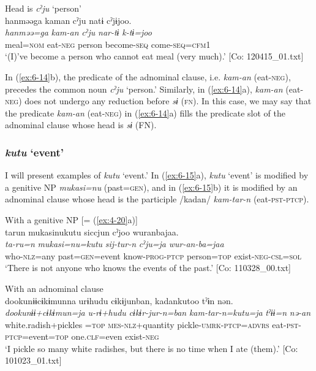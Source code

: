 \ex Head is \textit{cˀju} ‘person’\\
{\TM}
\glll  hanməəga  kaman  cˀju  natɨ  cˀjɨjoo.\\
\textit{hanməə=ga}  \textit{kam-an}  \textit{cˀju}  \textit{nar-tɨ}  \textit{k-tɨ=joo}\\
meal=\textsc{nom}  eat-\textsc{neg}  person  become-\textsc{seq}  come-\textsc{seq}=\textsc{cfm}1\\
\glt ‘(I)’ve become a person who cannot eat meal (very much).’ [Co: 120415\_01.txt]
\z
\z

In (\ref{ex:6-14}b), the predicate of the adnominal clause, i.e. \textit{kam-an} (eat-\textsc{neg}), precedes the common noun \textit{cˀju} ‘person.’ Similarly, in (\ref{ex:6-14}a), \textit{kam-an} (eat-\textsc{neg}) does not undergo any reduction before \textit{sɨ} (\textsc{fn}). In this case, we may say that the predicate \textit{kam-an} (eat-\textsc{neg}) in (\ref{ex:6-14}a) fills the predicate slot of the adnominal clause whose head is \textit{sɨ} (FN).

\subsubsection{\textit{kutu} ‘event’}

I will present examples of \textit{kutu} ‘event.’ In (\ref{ex:6-15}a), \textit{kutu} ‘event’ is modified by a genitive NP \textit{mukasi=nu} (past=\textsc{gen}), and in (\ref{ex:6-15}b) it is modified by an adnominal clause whose head is the participle /kadan/ \textit{kam-tar-n} (eat-\textsc{pst}-\textsc{ptcp}).

\ea\label{ex:6-15}
\ea With a genitive NP [= (\ref{ex:4-20}a)]\\
{\TM}
\glll  tarun  mukasinukutu  siccjun  cˀjoo  wuranbajaa.\\
\textit{ta-ru=n}  \textit{mukasi=nu=kutu}  \textit{sij-tur-n} \textit{cˀju=ja}  \textit{wur-an-ba=jaa}\\
who-\textsc{nlz}=any  past=\textsc{gen}=event  know-\textsc{prog}-\textsc{ptcp}   person=\textsc{top}  exist-\textsc{neg}-\textsc{csl}=\textsc{sol}\\
\glt ‘There is not anyone who knows the events of the past.’ [Co: 110328\_00.txt]

\ex With an adnominal clause\\
{\TM}
\glll  dookunɨɨcɨkɨmunna  urɨhudu  cɨkɨjunban,  kadankutoo  tˀɨn   nən.\\
\textit{dookunɨɨ+cɨkɨmun=ja}  \textit{u-rɨ+hudu}   \textit{cɨkɨr-jur-n=ban}  \textit{kam-tar-n=kutu=ja}  \textit{tˀɨɨ=n}  \textit{nə-an}\\
white.radish+pickles =\textsc{top}  \textsc{mes}-\textsc{nlz}+quantity  pickle-\textsc{umrk}-\textsc{ptcp}=\textsc{advrs}  eat-\textsc{pst}-\textsc{ptcp}=event=\textsc{top}  one.\textsc{clf}=even   exist-\textsc{neg}\\
\glt ‘I pickle so many white radishes, but there is no time when I ate (them).’ [Co: 101023\_01.txt]
\z
\z

